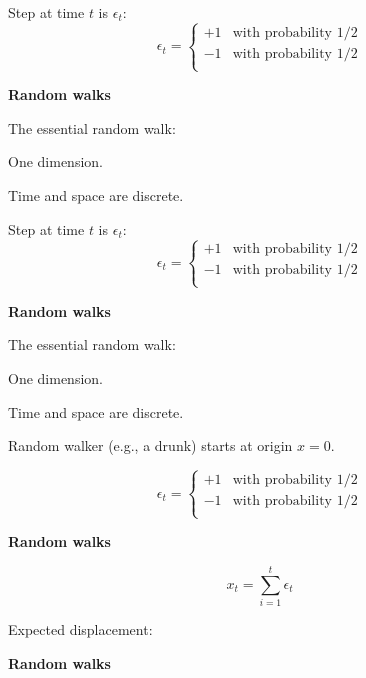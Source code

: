   Step at time $t$ is $\epsilon_t$:
  $$
  \epsilon_t = 
  \left\{
    \begin{array}{ll}
      +1 & \mbox{with probability 1/2} \\
      -1 & \mbox{with probability 1/2} \\
    \end{array}
  \right.
  $$


  \textbf{Random walks}

  The essential random walk:

   One dimension.

   Time and space are discrete.


  \inv

  Step at time $t$ is $\epsilon_t$:
  $$
  \epsilon_t = 
  \left\{
    \begin{array}{ll}
      +1 & \mbox{with probability 1/2} \\
      -1 & \mbox{with probability 1/2} \\
    \end{array}
  \right.
  $$



  \textbf{Random walks}

  The essential random walk:

   One dimension.

   Time and space are discrete.

  Random walker (e.g., a drunk) starts at origin $x=0$.

  $$
  \epsilon_t = 
  \left\{
    \begin{array}{ll}
      +1 & \mbox{with probability 1/2} \\
      -1 & \mbox{with probability 1/2} \\
    \end{array}
  \right.
  $$



  \textbf{Random walks}

  $$x_t = \sum_{i=1}^{t} \epsilon_t$$

  \inv

  Expected displacement:


  \textbf{Random walks}

